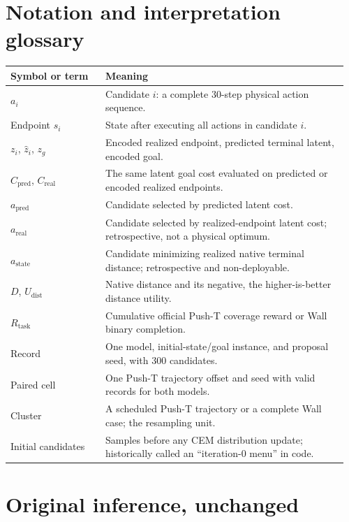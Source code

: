 \documentclass{article}
\begin{document}
\clearpage



\clearpage
\appendix
\section{Notation and interpretation glossary}
\label{app:glossary}

\begin{table}[h]
\centering
\begin{tabular}{@{}p{0.27\linewidth}p{0.69\linewidth}@{}}
\toprule
Symbol or term & Meaning\\
\midrule
$a_i$ & Candidate $i$: a complete 30-step physical action sequence.\\
Endpoint $s_i$ & State after executing all actions in candidate $i$.\\
$z_i$, $\hat z_i$, $z_g$ & Encoded realized endpoint, predicted terminal latent, encoded goal.\\
$C_{\mathrm{pred}}$, $C_{\mathrm{real}}$ & The same latent goal cost evaluated on predicted or encoded realized endpoints.\\
$a_{\mathrm{pred}}$ & Candidate selected by predicted latent cost.\\
$a_{\mathrm{real}}$ & Candidate selected by realized-endpoint latent cost; retrospective, not a physical optimum.\\
$a_{\mathrm{state}}$ & Candidate minimizing realized native terminal distance; retrospective and non-deployable.\\
$D$, $U_{\mathrm{dist}}$ & Native distance and its negative, the higher-is-better distance utility.\\
$R_{\mathrm{task}}$ & Cumulative official Push-T coverage reward or Wall binary completion.\\
Record & One model, initial-state/goal instance, and proposal seed, with 300 candidates.\\
Paired cell & One Push-T trajectory offset and seed with valid records for both models.\\
Cluster & A scheduled Push-T trajectory or a complete Wall case; the resampling unit.\\
Initial candidates & Samples before any CEM distribution update; historically called an ``iteration-0 menu'' in code.\\
\bottomrule
\end{tabular}
\end{table}

\section{Original inference, unchanged}
\label{app:original}
\end{document}
